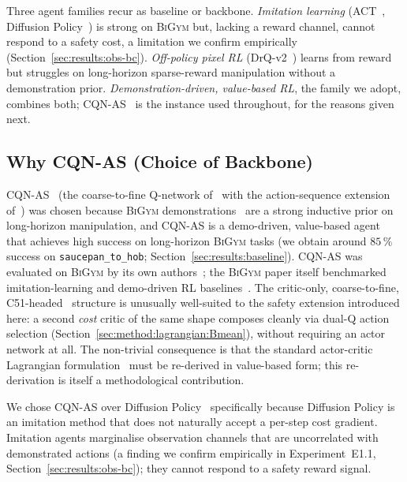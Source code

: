 \documentclass[11pt,a4paper]{report}
\newcommand{\bigym}{\textsc{BiGym}}
\newcommand{\cqnas}{CQN-AS}
\begin{document}
Three agent families recur as baseline or backbone.
\emph{Imitation learning} (ACT~\cite{zhao2023act}, Diffusion
Policy~\cite{chi2023diffusion}) is strong on \bigym{} but, lacking a
reward channel, cannot respond to a safety cost, a limitation we
confirm empirically (Section~\ref{sec:results:obs-bc}).
\emph{Off-policy pixel RL} (DrQ-v2~\cite{yarats2021drqv2}) learns
from reward but struggles on long-horizon sparse-reward manipulation
without a demonstration prior. \emph{Demonstration-driven,
value-based RL}, the family we adopt, combines both;
\cqnas{}~\cite{seo2024cqnas} is the instance used throughout, for
the reasons given next.

\subsection{Why \cqnas{} (Choice of Backbone)}
\label{sec:bg:rl:cqnas}

\cqnas{}~\cite{seo2024cqnas,seo2025actionsequence} (the
coarse-to-fine Q-network of~\cite{seo2024cqnas} with the
action-sequence extension of~\cite{seo2025actionsequence}) was
chosen because \bigym{}
demonstrations~\cite{chernyadev2024bigym} are a strong inductive
prior on long-horizon manipulation, and \cqnas{} is a demo-driven,
value-based agent that achieves high success on long-horizon
\bigym{} tasks (we obtain around $85\,\%$ success on
\texttt{saucepan\_to\_hob}; Section~\ref{sec:results:baseline}).
\cqnas{} was evaluated on \bigym{} by its own
authors~\cite{seo2024cqnas}; the \bigym{} paper itself benchmarked
imitation-learning and demo-driven RL baselines~\cite{chernyadev2024bigym}.
The critic-only, coarse-to-fine,
C51-headed~\cite{bellemare2017c51} structure is unusually
well-suited to the safety extension introduced here: a second
\emph{cost} critic of the same shape composes cleanly via dual-Q
action selection (Section~\ref{sec:method:lagrangian:Bmean}),
without requiring an actor network at all. The non-trivial
consequence is that the standard actor-critic Lagrangian
formulation~\cite{ray2019safetygym,stooke2020pid} must be re-derived
in value-based form; this re-derivation is itself a methodological
contribution.

We chose \cqnas{} over Diffusion Policy~\cite{chi2023diffusion}
specifically because Diffusion Policy is an imitation method that
does not naturally accept a per-step cost gradient. Imitation
agents marginalise observation channels that are uncorrelated with
demonstrated actions (a finding we confirm empirically in
Experiment~E1.1, Section~\ref{sec:results:obs-bc}); they cannot
respond to a safety reward signal.
\end{document}

